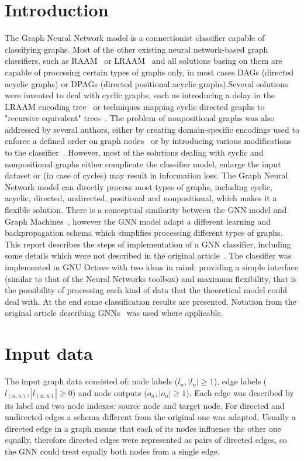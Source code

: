 \documentclass[]{spie}  %
\begin{document}
\section{Introduction}
The Graph Neural Network model is a connectionist classifier capable of classifying graphs. Most of the other existing neural network-based graph classifiers, such as RAAM~\cite{pollack1990recursive} or  LRAAM~\cite{sperduti1994labelling} and all solutions basing on them are capable of processing certain types of graphs only, in most cases DAGs (directed acyclic graphs) or DPAGs (directed positional acyclic graphs).Several solutions were invented to deal with cyclic graphs, such as introducing a delay in the LRAAM encoding tree~\cite{goulon2005hopfield} or techniques mapping cyclic directed graphs to "recursive equivalent" trees~\cite{bianchini2003backpropagation}. The problem of nonpositional graphs was also addressed by several authors, either by creating domain-specific encodings used to enforce a defined order on graph nodes~\cite{ivanciuc2003canonical} or by introducing various modifications to the classifier~\cite{bianchini2005recursive}. However, most of the solutions dealing with cyclic and nonpositional graphs either complicate the classifier model, enlarge the input dataset or (in case of cycles) may result in information loss. The Graph Neural Network model can directly process most types of graphs, including cyclic, acyclic, directed, undirected, positional and nonpositional, which makes it a flexible solution. There is a conceptual similarity between the GNN model and Graph Machines~\cite{goulon2005learning}, however the GNN model adapt a different learning and backpropagation schema which simplifies processing different types of graphs. This report describes the steps of implementation of a GNN classifier, including some details which were not described in the original article~\cite{scarselli2009graph}. The classifier was implemented in GNU Octave with two ideas in mind: providing a simple interface (similar to that of the Neural Networks toolbox) and maximum flexibility, that is the possibility of processing each kind of data that the theoretical model could deal with. At the end some classification results are presented. Notation from the original article describing GNNs~\cite{scarselli2009graph} was used where applicable.

\section{Input data}
The input graph data consisted of: node labels ($l_n, |l_n| \geq 1$), edge labels ($l_{(n,u)}, |l_{(n,u)}| \geq 0$) and node outputs ($o_n, |o_n| \geq 1$). Each edge was described by its label and two node indexes: source node and target node. For directed and undirected edges a schema different from the original one was adapted. Usually a directed edge in a graph means that each of its nodes influence the other one equally, therefore directed edges were represented as pairs of directed edges, so the GNN could treat equally both nodes from a single edge.
\end{document}
